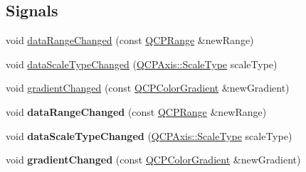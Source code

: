 \subsection*{Signals}
\begin{DoxyCompactItemize}
\item 
void \hyperlink{class_q_c_p_color_scale_a685717490a6aa83c5e711a4f34e837f9}{data\+Range\+Changed} (const \hyperlink{class_q_c_p_range}{Q\+C\+P\+Range} \&new\+Range)
\item 
void \hyperlink{class_q_c_p_color_scale_a61558b962f7791ff2f15a565dcf60181}{data\+Scale\+Type\+Changed} (\hyperlink{class_q_c_p_axis_a36d8e8658dbaa179bf2aeb973db2d6f0}{Q\+C\+P\+Axis\+::\+Scale\+Type} scale\+Type)
\item 
void \hyperlink{class_q_c_p_color_scale_a5e5f8c5626242c8f7308bfab74d3d989}{gradient\+Changed} (const \hyperlink{class_q_c_p_color_gradient}{Q\+C\+P\+Color\+Gradient} \&new\+Gradient)
\item 
void {\bfseries data\+Range\+Changed} (const \hyperlink{class_q_c_p_range}{Q\+C\+P\+Range} \&new\+Range)\hypertarget{class_q_c_p_color_scale_a685717490a6aa83c5e711a4f34e837f9}{}\label{class_q_c_p_color_scale_a685717490a6aa83c5e711a4f34e837f9}

\item 
void {\bfseries data\+Scale\+Type\+Changed} (\hyperlink{class_q_c_p_axis_a36d8e8658dbaa179bf2aeb973db2d6f0}{Q\+C\+P\+Axis\+::\+Scale\+Type} scale\+Type)\hypertarget{class_q_c_p_color_scale_a61558b962f7791ff2f15a565dcf60181}{}\label{class_q_c_p_color_scale_a61558b962f7791ff2f15a565dcf60181}

\item 
void {\bfseries gradient\+Changed} (const \hyperlink{class_q_c_p_color_gradient}{Q\+C\+P\+Color\+Gradient} \&new\+Gradient)\hypertarget{class_q_c_p_color_scale_a5e5f8c5626242c8f7308bfab74d3d989}{}\label{class_q_c_p_color_scale_a5e5f8c5626242c8f7308bfab74d3d989}

\end{DoxyCompactItemize}
